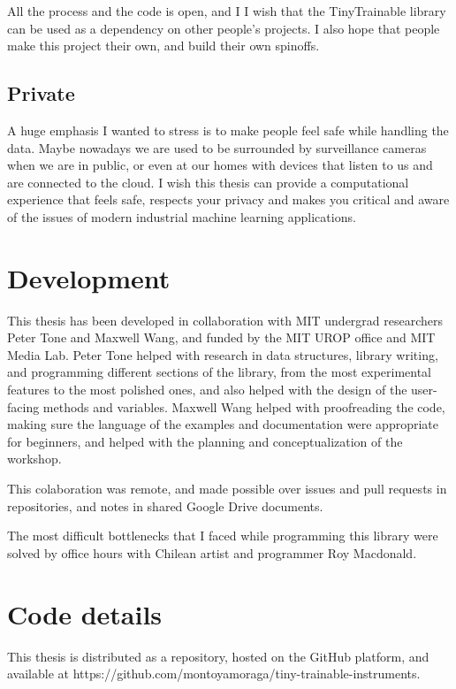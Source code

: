 All the process and the code is open, and I I wish that the TinyTrainable library can be used as a dependency on other people's projects. I also hope that people make this project their own, and build their own spinoffs. 

\subsection{Private}

A huge emphasis I wanted to stress is to make people feel safe while handling the data. Maybe nowadays we are used to be surrounded by surveillance cameras when we are in public, or even at our homes with devices that listen to us and are connected to the cloud. I wish this thesis can provide a computational experience that feels safe, respects your privacy and makes you critical and aware of the issues of modern industrial machine learning applications.

\section{Development}

This thesis has been developed in collaboration with MIT undergrad researchers Peter Tone and Maxwell Wang, and funded by the MIT UROP office and MIT Media Lab. Peter Tone helped with research in data structures, library writing, and programming different sections of the library, from the most experimental features to the most polished ones, and also helped with the design of the user-facing methods and variables. Maxwell Wang helped with proofreading the code, making sure the language of the examples and documentation were appropriate for beginners, and helped with the planning and conceptualization of the workshop. 

This colaboration was remote, and made possible over issues and pull requests in repositories, and notes in shared Google Drive documents.

The most difficult bottlenecks that I faced while programming this library were solved by office hours with Chilean artist and programmer Roy Macdonald.

\section{Code details}

This thesis is distributed as a repository, hosted on the GitHub platform, and available at https://github.com/montoyamoraga/tiny-trainable-instruments.

